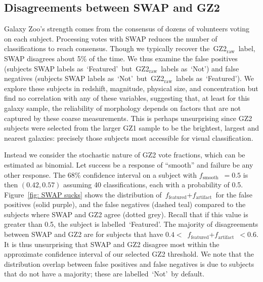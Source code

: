 \documentclass[twocolumn,  trackchanges, ]{aastex6}%
\newcommand{\feat}{`Featured'}
\newcommand{\notfeat}{`Not'}
\newcommand{\raw}{GZ2$_{\text{raw}}$}
\newcommand{\ffeat}{$f_{\mathrm{featured}}$}
\newcommand{\fsmooth}{$f_{\mathrm{smooth}}$}
\newcommand{\fstar}{$f_{\mathrm{artifact}}$}
\begin{document}
\subsection{Disagreements between SWAP and GZ2}\label{sec: swap gz2 disagree}

Galaxy Zoo's strength comes from the consensus of dozens of volunteers voting on each subject. Processing votes with SWAP reduces the number of classifications to reach consensus. Though we typically recover the~\raw~label, SWAP disagrees about 5\% of the time. We thus examine the false positives (subjects SWAP labels as~\feat~but~\raw~labels as~\notfeat) and false negatives (subjects SWAP labels as~\notfeat~but~\raw~labels as~\feat). We explore these subjects in redshift, magnitude, physical size, and concentration but find no correlation with any of these variables, suggesting that, at least for this galaxy sample, the reliability of morphology depends on factors that are not captured by these coarse measurements. This is perhaps unsurprising since GZ2 subjects were selected from the larger GZ1 sample to be the brightest, largest and nearest galaxies:  precisely those subjects most accessible for visual classification. 

Instead we consider the stochastic nature of GZ2 vote fractions, which can be estimated as binomial. Let success be a response of ``smooth'' and failure be any other response. The $68\%$ confidence interval on a subject with \fsmooth~$=0.5$ is then $(0.42, 0.57)$ assuming 40 classifications, each with a probability of 0.5. Figure~\ref{fig: SWAP sucks} shows the distribution of~\ffeat+\fstar~for the false positives (solid purple), and the false negatives (dashed teal) compared to the  subjects where SWAP and GZ2 agree (dotted grey).  Recall that if this value is greater than 0.5, the subject is labelled~\feat. The majority of disagreements between SWAP and GZ2 are for subjects that have $0.4 <$~\ffeat+\fstar~$< 0.6$. It is thus unsurprising that SWAP and GZ2 disagree most within the approximate confidence interval of our selected GZ2 threshold. We note that the distribution overlap between false positives and false negatives is due to subjects that do not have a majority; these are labelled~\notfeat~by default. 
\end{document}
